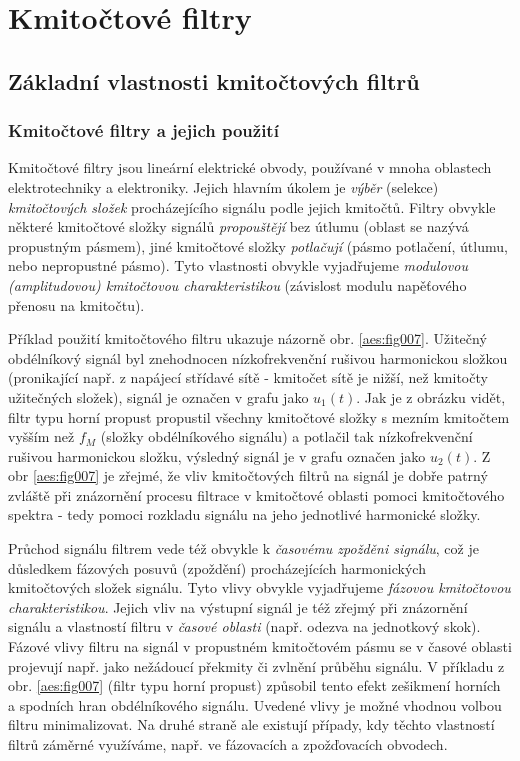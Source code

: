 \chapter{Kmitočtové filtry}
\minitoc

  \section{Základní vlastnosti kmitočtových filtrů}
    \subsection{Kmitočtové filtry a jejich použití}
      Kmitočtové filtry jsou lineární elektrické obvody, používané v mnoha oblastech elektrotechniky
      a elektroniky. Jejich hlavním úkolem je \emph{výběr} (selekce) \emph{kmitočtových složek}
      procházejícího signálu podle jejich kmitočtů. Filtry obvykle některé kmitočtové složky signálů
      \emph{propouštějí} bez útlumu (oblast se nazývá propustným pásmem), jiné kmitočtové složky
      \emph{potlačují} (pásmo potlačení, útlumu, nebo nepropustné pásmo). Tyto vlastnosti obvykle
      vyjadřujeme \emph{modulovou (amplitudovou) kmitočtovou charakteristikou} (závislost modulu
      napěťového přenosu na kmitočtu).

      Příklad použití kmitočtového filtru ukazuje názorně obr. \ref{aes:fig007}. Užitečný 
      obdélníkový signál byl znehodnocen níz\-ko\-frek\-ven\-ční rušivou harmonickou složkou 
      (pronikající např. z napájecí střídavé sítě - kmitočet sítě je nižší, než kmitočty užitečných 
      složek), signál je označen v grafu jako \(u_1(t)\). Jak je z obrázku vidět, filtr typu horní 
      propust propustil všechny kmitočtové složky s mezním kmitočtem vyšším než \(f_M\) (složky 
      obdélníkového signálu) a potlačil tak nízkofrekvenční rušivou harmonickou složku, výsledný 
      signál je v grafu označen jako \(u_2(t)\). Z obr \ref{aes:fig007} je zřejmé, že vliv 
      kmitočtových filtrů na signál je dobře patrný zvláště při znázornění procesu filtrace v 
      kmitočtové oblasti pomoci kmitočtového spektra - tedy pomoci rozkladu signálu na jeho 
      jednotlivé harmonické složky.

      Průchod signálu filtrem vede též obvykle k \emph{časovému zpožděni signálu}, což je důsledkem
      fázových posuvů (zpoždění) procházejících harmonických kmitočtových složek signálu. Ty\-to 
      vlivy obvykle vyjadřujeme \emph{fázovou kmitočtovou charakteristikou}. Jejich vliv na výstupní
      signál je též zřejmý při znázornění signálu a vlastností filtru v \emph{časové oblasti} (např.
      odezva na jednotkový skok). Fázové vlivy filtru na signál v propustném kmitočtovém pásmu se v
      časové oblasti projevují např. jako nežádoucí překmity či zvlnění průběhu signálu. V příkladu
      z obr. \ref{aes:fig007} (filtr typu horní propust) způsobil tento efekt zešikmení horních a 
      spodních hran obdélníkového signálu. Uvedené vlivy je možné vhodnou volbou filtru 
      minimalizovat. Na druhé straně ale existují případy, kdy těchto vlastností filtrů záměrné 
      využíváme, např. ve fázovacích a zpožďovacích obvodech.

